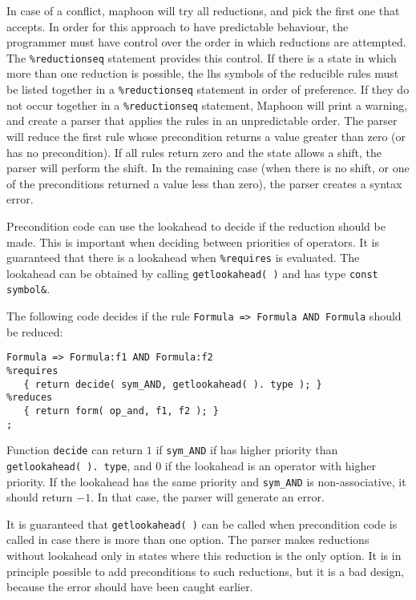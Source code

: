 \documentclass{article}
\begin{document}
In case of a conflict, maphoon will try all reductions,
and pick the first one that accepts. 
In order for this approach to have predictable behaviour, 
the programmer must
have control over the order in which reductions are attempted.
The \verb+%reductionseq+ statement provides this control. 
If there is a state in which more than one
reduction is possible, the lhs symbols of the reducible rules
must be listed together in a \verb+%reductionseq+ statement in order 
of preference.
If they do not occur together
in a \verb+%reductionseq+ statement, Maphoon will print a warning,
and create a parser that applies the rules in an unpredictable order. 
The parser will reduce the first rule whose precondition returns
a value greater than zero (or has no precondition). 
If all rules return zero and the state allows a shift, 
the parser will perform the shift. 
In the remaining case (when there is no shift, or
one of the preconditions returned a value less than zero), 
the parser creates a syntax error.

Precondition code can use the lookahead to decide if the reduction
should be made. 
This is important when deciding between
priorities of operators. 
It is guaranteed that there is a lookahead
when \verb+%requires+ is evaluated. 
The lookahead can be obtained by calling 
\verb+getlookahead( )+ and has type \verb+const symbol&+. 

The following code decides if the rule 
\verb+Formula => Formula AND Formula+ should be reduced:

\begin{verbatim}
Formula => Formula:f1 AND Formula:f2
%requires
   { return decide( sym_AND, getlookahead( ). type ); }
%reduces
   { return form( op_and, f1, f2 ); } 
; \end{verbatim}
Function \verb+decide+ can return $1$ if \verb+sym_AND+ if has
higher priority than \\ \verb+getlookahead( ). type+,
and $0$ if the lookahead
is an operator with higher priority. If the lookahead has the same priority
and \verb+sym_AND+ is non-associative, it should return $ -1. $ 
In that case, the parser will generate an error. 

It is guaranteed that \verb+getlookahead( )+
can be called when precondition code is called in case there is more
than one option.  
The parser makes reductions without lookahead only in states 
where this reduction is the only option. 
It is in principle possible to add preconditions to such reductions,
but it is a bad design, because the error should have been caught earlier.
\end{document}
